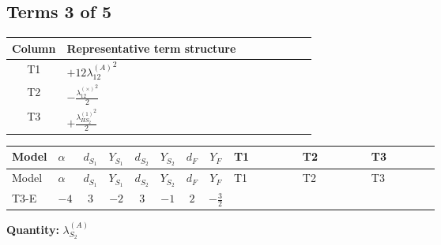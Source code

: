 \documentclass[8pt]{article}
\begin{document}
\begin{landscape}
\subsection*{Terms 3 of 5}
\begin{center}
\begin{tabular}{@{}c >{\raggedright\arraybackslash}p{0.82\linewidth}@{}}
\toprule
Column & Representative term structure \\
\midrule
T1 & \(\displaystyle +12 {\lambda_{12}^{(A)}}^2\) \\
\midrule
T2 & \(\displaystyle -\frac{{\lambda_{12}^{(\times)}}^2}{2}\) \\
\midrule
T3 & \(\displaystyle +\frac{{\lambda_{HS_2}^{(1)}}^2}{2}\) \\
\midrule
\bottomrule
\end{tabular}
\end{center}
\smallskip
\tiny
\begin{longtable}{@{}llcccccc >{\raggedright\arraybackslash}p{0.21\linewidth} >{\raggedright\arraybackslash}p{0.21\linewidth} >{\raggedright\arraybackslash}p{0.21\linewidth}@{}}
\toprule
Model & $\alpha$ & $d_{S_1}$ & $Y_{S_1}$ & $d_{S_2}$ & $Y_{S_2}$ & $d_F$ & $Y_F$ & T1 & T2 & T3 \\
\midrule
\endfirsthead
\toprule
Model & $\alpha$ & $d_{S_1}$ & $Y_{S_1}$ & $d_{S_2}$ & $Y_{S_2}$ & $d_F$ & $Y_F$ & T1 & T2 & T3 \\
\midrule
\endhead
T3-E & $-4$ & $3$ & $-2$ & $3$ & $-1$ & $2$ & $-\frac{3}{2}$ & \scriptsize\adjustbox{max width=\linewidth}{$\begin{gathered} +12 {\lambda_{12}^{(A)}}^2\end{gathered}$} & \scriptsize\adjustbox{max width=\linewidth}{$\begin{gathered} -\frac{{\lambda_{12}^{(\times)}}^2}{2}\end{gathered}$} & \scriptsize\adjustbox{max width=\linewidth}{$\begin{gathered} +\frac{{\lambda_{HS_2}^{(1)}}^2}{2}\end{gathered}$} \\
\midrule
\bottomrule
\end{longtable}
\clearpage
\noindent\textbf{Quantity: }$\lambda_{S_2}^{(A)}$\par\smallskip

\end{landscape}
\end{document}
